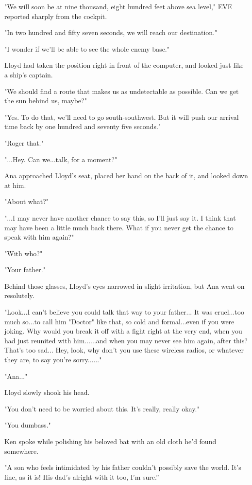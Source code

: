\documentclass[
]{article}
\begin{document}
"We will soon be at nine thousand, eight hundred feet above sea level,"
EVE reported sharply from the cockpit.

"In two hundred and fifty seven seconds, we will reach our destination."

"I wonder if we'll be able to see the whole enemy base."

Lloyd had taken the position right in front of the computer, and looked
just like a ship's captain.

"We should find a route that makes us as undetectable as possible. Can
we get the sun behind us, maybe?"

"Yes. To do that, we'll need to go south-southwest. But it will push our
arrival time back by one hundred and seventy five seconds."

"Roger that."

"...Hey. Can we...talk, for a moment?"

Ana approached Lloyd's seat, placed her hand on the back of it, and
looked down at him.

"About what?"

"...I may never have another chance to say this, so I'll just say it. I
think that may have been a little much back there. What if you never get
the chance to speak with him again?"

"With who?"

"Your father."

Behind those glasses, Lloyd's eyes narrowed in slight irritation, but
Ana went on resolutely.

"Look...I can't believe you could talk that way to your father... It was
cruel...too much so...to call him "Doctor" like that, so cold and
formal...even if you were joking. Why would you break it off with a
fight right at the very end, when you had just reunited with
him......and when you may never see him again, after this? That's too
sad... Hey, look, why don't you use these wireless radios, or whatever
they are, to say you're sorry......"

"Ana..."

Lloyd slowly shook his head.

"You don't need to be worried about this. It's really, really okay."

"You dumbass."

Ken spoke while polishing his beloved bat with an old cloth he'd found
somewhere.

"A son who feels intimidated by his father couldn't possibly save the
world. It's fine, as it is! His dad's alright with it too, I'm sure.''
\end{document}
